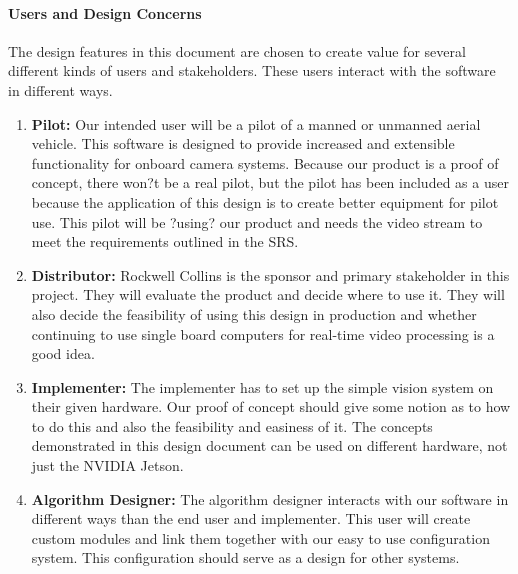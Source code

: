 	\paragraph{Users and Design Concerns}
	The design features in this document are chosen to create value for several different
kinds of users and stakeholders. These users interact with the software in different ways.\\
	\begin{enumerate}[leftmargin=2cm,labelindent=2cm]
    	\item \textbf{Pilot:}
	Our intended user will be a pilot of a manned or unmanned aerial vehicle. This software
	is designed to provide increased and extensible functionality for onboard camera
	systems. Because our product is a proof of concept, there won?t be a real pilot, but the
	pilot has been included as a user because the application of this design is to create
	better equipment for pilot use. This pilot will be ?using? our product and needs the
	video stream to meet the requirements outlined in the SRS.
	\item \textbf{Distributor:}
	Rockwell Collins is the sponsor and primary stakeholder in this project. They will
	evaluate the product and decide where to use it. They will also decide the feasibility of
	using this design in production and whether continuing to use single board computers
	for real-time video processing is a good idea.
	\item \textbf{Implementer:}
	The implementer has to set up the simple vision system on their given hardware. Our
	proof of concept should give some notion as to how to do this and also the feasibility
	and easiness of it. The concepts demonstrated in this design document can be used on
	different hardware, not just the NVIDIA Jetson.
	\item \textbf{Algorithm Designer:}
	The algorithm designer interacts with our software in different ways than the end user
	and implementer. This user will create custom modules and link them together with our
	easy to use configuration system. This configuration should serve as a design for other
	systems.\\
	\end{enumerate}
	
